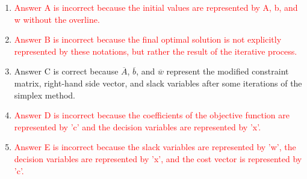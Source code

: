 \documentclass{article}%
\newcommand{\incorrect}[1]{\textcolor{red}{#1}}
\begin{document}
\begin{enumerate}[label=\Alph*.]%
\item \incorrect{Answer A is incorrect because the initial values are represented by A, b, and w without the overline.}%
\item \incorrect{Answer B is incorrect because the final optimal solution is not explicitly represented by these notations, but rather the result of the iterative process.}%
\item Answer C is correct because $\overline{A}$, $\overline{b}$, and $\overline{w}$ represent the modified constraint matrix, right-hand side vector, and slack variables after some iterations of the simplex method.%
\item \incorrect{Answer D is incorrect because the coefficients of the objective function are represented by 'c' and the decision variables are represented by 'x'.}%
\item \incorrect{Answer E is incorrect because the slack variables are represented by 'w', the decision variables are represented by 'x', and the cost vector is represented by 'c'.}%
\end{enumerate}%
\vspace{1em}

%
\end{document}
